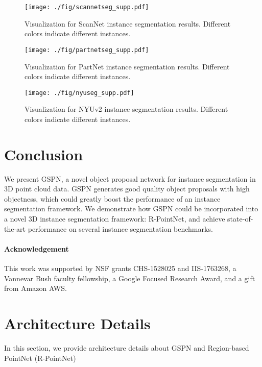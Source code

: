 \documentclass[10pt,twocolumn,letterpaper]{article}
\begin{document}
\begin{figure*}
    \centering
    \texttt{[image: ./fig/scannetseg\_supp.pdf]}
    \caption{Visualization for ScanNet instance segmentation results. Different colors indicate different instances.}
    \label{fig:scannetseg_supp}
\vspace{-\baselineskip}
\end{figure*}

\begin{figure*}
    \centering
    \texttt{[image: ./fig/partnetseg\_supp.pdf]}
    \caption{Visualization for PartNet instance segmentation results. Different colors indicate different instances.}
    \label{fig:partnetseg_supp}
\vspace{-\baselineskip}
\end{figure*}

\begin{figure*}
    \centering
    \texttt{[image: ./fig/nyuseg\_supp.pdf]}
    \caption{Visualization for NYUv2 instance segmentation results. Different colors indicate different instances.}
    \label{fig:nyuseg_supp}
\vspace{-\baselineskip}
\end{figure*} 
\section{Conclusion}
We present GSPN, a novel object proposal network for instance segmentation in 3D point cloud data. GSPN generates good quality object proposals with high objectness, which could greatly boost the performance of an instance segmentation framework. We demonstrate how GSPN could be incorporated into a novel 3D instance segmentation framework: R-PointNet, and achieve state-of-the-art performance on several instance segmentation benchmarks.



\paragraph{Acknowledgement} This work was supported by NSF grants CHS-1528025 and IIS-1763268, a Vannevar Bush faculty fellowship, a Google Focused Research Award, and a gift from Amazon AWS. 


{\small


}

\appendix
\appendix 

\section{Architecture Details}
\label{sec:arc_details}
In this section, we provide architecture details about GSPN and Region-based PointNet (R-PointNet)
\end{document}
